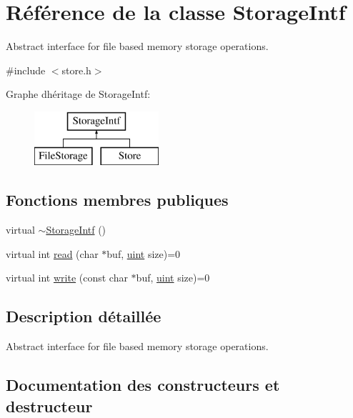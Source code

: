 \hypertarget{class_storage_intf}{}\section{Référence de la classe Storage\+Intf}
\label{class_storage_intf}


Abstract interface for file based memory storage operations.  




{\ttfamily \#include $<$store.\+h$>$}

Graphe d\textquotesingle{}héritage de Storage\+Intf\+:\begin{figure}[H]
\begin{center}
\leavevmode
\includegraphics[height=2.000000cm]{class_storage_intf}
\end{center}
\end{figure}
\subsection*{Fonctions membres publiques}
\begin{DoxyCompactItemize}
\item 
virtual \hyperlink{class_storage_intf_a20aa41248a1ea20f9829cce656171bd0}{$\sim$\+Storage\+Intf} ()
\item 
virtual int \hyperlink{class_storage_intf_a125b99d1511364f4fe49709feec46bb4}{read} (char $\ast$buf, \hyperlink{qglobal_8h_a4d3943ddea65db7163a58e6c7e8df95a}{uint} size)=0
\item 
virtual int \hyperlink{class_storage_intf_a97b26023c6cf0590423e428947d6febb}{write} (const char $\ast$buf, \hyperlink{qglobal_8h_a4d3943ddea65db7163a58e6c7e8df95a}{uint} size)=0
\end{DoxyCompactItemize}


\subsection{Description détaillée}
Abstract interface for file based memory storage operations. 

\subsection{Documentation des constructeurs et destructeur}
\hypertarget{class_storage_intf_a20aa41248a1ea20f9829cce656171bd0}{}
